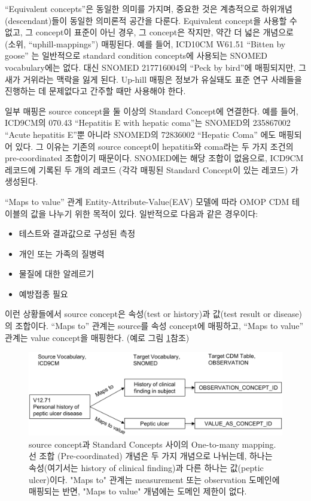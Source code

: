 \documentclass[11pt]{book}
\providecommand{\tightlist}{%
  \setlength{\itemsep}{0pt}\setlength{\parskip}{0pt}}
\theoremstyle{definition}
\theoremstyle{definition}
\theoremstyle{definition}
\theoremstyle{remark}
\begin{document}
``Equivalent concepts''은 동일한 의미를 가지며, 중요한 것은 계층적으로
하위개념(descendant)들이 동일한 의미론적 공간을 다룬다. Equivalent
concept을 사용할 수 없고, 그 concept이 표준이 아닌 경우, 그 concept은
작지만, 약간 더 넓은 개념으로 (소위, ``uphill-mappings'') 매핑된다. 예를
들어, ICD10CM W61.51 ``Bitten by goose'' 는 일반적으로 standard
condition concepts에 사용되는 SNOMED vocabulary에는 없다. 대신 SNOMED
217716004의 ``Peck by bird''에 매핑되지만, 그 새가 거위라는 맥락을 잃게
된다. Up-hill 매핑은 정보가 유실돼도 표준 연구 사례들을 진행하는 데
문제없다고 간주할 때만 사용해야 한다.

일부 매핑은 source concept을 둘 이상의 Standard Concept에 연결한다. 예를
들어, ICD9CM의 070.43 ``Hepatitis E with hepatic coma''는 SNOMED의
235867002 ``Acute hepatitis E''뿐 아니라 SNOMED의 72836002 ``Hepatic
Coma'' 에도 매핑되어 있다. 그 이유는 기존의 source concept이 hepatitis와
coma라는 두 가지 조건의 pre-coordinated 조합이기 때문이다. SNOMED에는
해당 조합이 없음으로, ICD9CM 레코드에 기록된 두 개의 레코드 (각각 매핑된
Standard Concept이 있는 레코드) 가 생성된다.

``Maps to value'' 관계 Entity-Attribute-Value(EAV) 모델에 따라 OMOP CDM
테이블의 값을 나누기 위한 목적이 있다. 일반적으로 다음과 같은 경우이다:

\begin{itemize}
\tightlist
\item
  테스트와 결과값으로 구성된 측정
\item
  개인 또는 가족의 질병력
\item
  물질에 대한 알레르기
\item
  예방접종 필요
\end{itemize}

이런 상황들에서 source concept은 속성(test or history)과 값(test result
or disease)의 조합이다. ``Maps to'' 관계는 source를 속성 concept에
매핑하고, ``Maps to value'' 관계는 value concept을 매핑한다. (예로 그림
\ref{fig:conceptValue}참조)

\begin{figure}

{\centering \includegraphics[width=1\linewidth]{images/StandardizedVocabularies/conceptValue} 

}

\caption{source concept과 Standard Concepts 사이의 One-to-many mapping. 선 조합 (Pre-coordinated) 개념은 두 가지 개념으로 나뉘는데, 하나는 속성(여기서는 history of clinical finding)과 다른 하나는 값(peptic ulcer)이다. "Maps to" 관계는 measurement 또는 observation 도메인에 매핑되는 반면, "Maps to value" 개념에는 도메인 제한이 없다.}\label{fig:conceptValue}
\end{figure}
\end{document}
